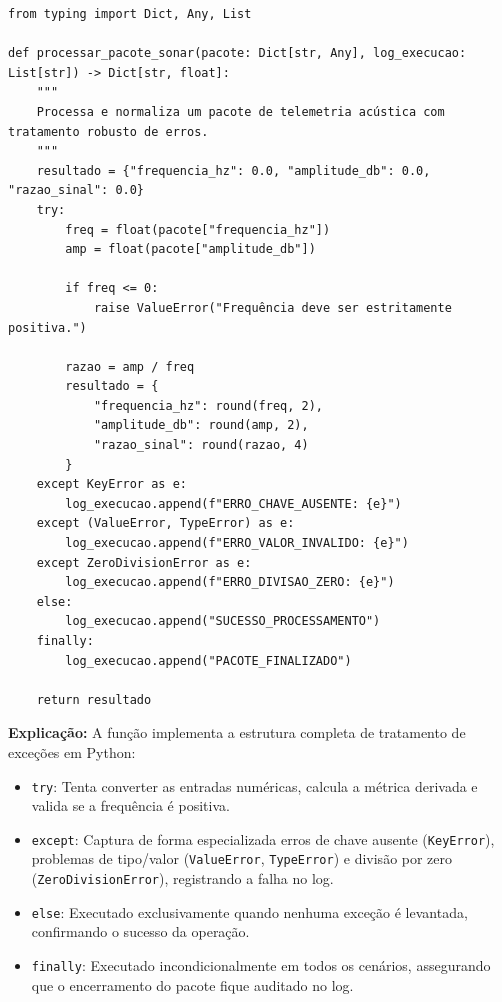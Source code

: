 \ifmostrarGabarito
\begin{verbatim}
from typing import Dict, Any, List

def processar_pacote_sonar(pacote: Dict[str, Any], log_execucao: List[str]) -> Dict[str, float]:
    """
    Processa e normaliza um pacote de telemetria acústica com tratamento robusto de erros.
    """
    resultado = {"frequencia_hz": 0.0, "amplitude_db": 0.0, "razao_sinal": 0.0}
    try:
        freq = float(pacote["frequencia_hz"])
        amp = float(pacote["amplitude_db"])
        
        if freq <= 0:
            raise ValueError("Frequência deve ser estritamente positiva.")
            
        razao = amp / freq
        resultado = {
            "frequencia_hz": round(freq, 2),
            "amplitude_db": round(amp, 2),
            "razao_sinal": round(razao, 4)
        }
    except KeyError as e:
        log_execucao.append(f"ERRO_CHAVE_AUSENTE: {e}")
    except (ValueError, TypeError) as e:
        log_execucao.append(f"ERRO_VALOR_INVALIDO: {e}")
    except ZeroDivisionError as e:
        log_execucao.append(f"ERRO_DIVISAO_ZERO: {e}")
    else:
        log_execucao.append("SUCESSO_PROCESSAMENTO")
    finally:
        log_execucao.append("PACOTE_FINALIZADO")
        
    return resultado
\end{verbatim}

\textbf{Explicação:}
A função implementa a estrutura completa de tratamento de exceções em Python:
\begin{itemize}[leftmargin=*]
    \item \texttt{try}: Tenta converter as entradas numéricas, calcula a métrica derivada e valida se a frequência é positiva.
    \item \texttt{except}: Captura de forma especializada erros de chave ausente (\texttt{KeyError}), problemas de tipo/valor (\texttt{ValueError}, \texttt{TypeError}) e divisão por zero (\texttt{ZeroDivisionError}), registrando a falha no log.
    \item \texttt{else}: Executado exclusivamente quando nenhuma exceção é levantada, confirmando o sucesso da operação.
    \item \texttt{finally}: Executado incondicionalmente em todos os cenários, assegurando que o encerramento do pacote fique auditado no log.
\end{itemize}
\fi
